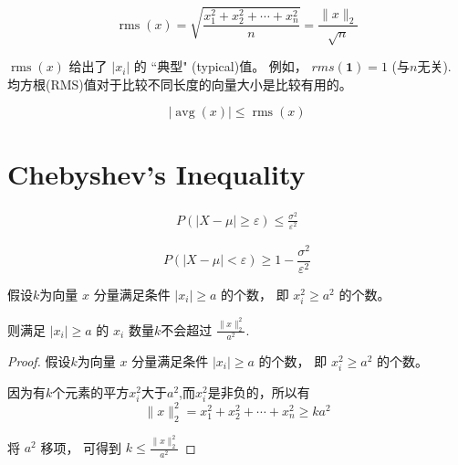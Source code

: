 \begin{definition}
    \begin{equation} \operatorname{rms}(x)=\sqrt{\frac{x_{1}^{2}+x_{2}^{2}+\cdots+x_{n}^{2}}{n}}=\frac{\|x\|_{2}}{\sqrt{n}} \end{equation}
\end{definition}

$ \operatorname{rms}(x) $ 给出了 $ \left|x_{i}\right| $ 的 “典型" (typical)值。 例如， $ {rms}(\mathbf{1})=1 $ (与$n$无关). 均方根(RMS)值对于比较不同长度的向量大小是比较有用的。 

\begin{theorem}
    \begin{equation} |\operatorname{avg}(x)| \leq \operatorname{r m s}(x) \end{equation}
\end{theorem}

\section{Chebyshev's Inequality}

\begin{theorem}
\begin{equation}
\begin{aligned}
    P(|X-\mu| \ge \varepsilon) \le \frac{\sigma^2}{\varepsilon^2}
\end{aligned}
\end{equation}

\begin{equation}
 P(|X-\mu| < \varepsilon) \ge 1 - \frac{\sigma^2}{\varepsilon^2}
\end{equation}
\end{theorem}

    

   
\begin{theorem}
    假设$k$为向量 $ x $ 分量满足条件 $ \left|x_{i}\right| \geq a $ 的个数， 即 $ x_{i}^{2} \geq a^{2} $ 的个数。 

    则满足 $ \left|x_{i}\right| \geq a $ 的 $ x_{i} $ 数量$k$不会超过 $ \frac{\| x \|_{2}^{2}}{a^{2}} $.
\end{theorem}

\begin{proof}
    假设$k$为向量 $ x $ 分量满足条件 $ \left|x_{i}\right| \geq a $ 的个数， 即 $ x_{i}^{2} \geq a^{2} $ 的个数。
    
    因为有$k$个元素的平方$x_i^2$大于$a^{2}$,而$x_i^2$是非负的，所以有
    \begin{equation} \|x\|_{2}^{2}=x_{1}^{2}+x_{2}^{2}+\cdots+x_{n}^{2} \geq k a^{2} \end{equation}

    将 $ a^{2} $ 移项， 可得到 $ k \leq \frac{\|x\|_{2}^{2}}{a^{2}} $
\end{proof}

